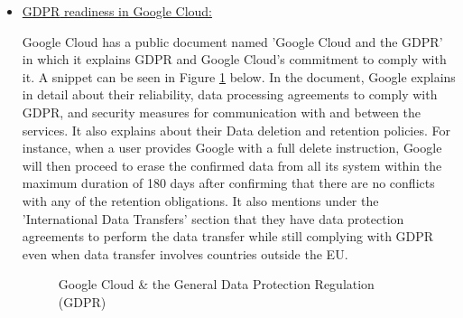 \begin{itemize}
    \item \underline{\acs{GDPR} readiness in Google Cloud:}

    Google Cloud has a public document named 'Google Cloud and the \ac{GDPR}' \cite{gcgdpr} in which it explains \acs{GDPR} and Google Cloud's commitment to comply with it. A snippet can be seen in Figure \ref{googlegdpr} below. In the document, Google explains in detail about their reliability, data processing agreements to comply with \acs{GDPR}, and security measures for communication with and between the services. It also explains about their Data deletion and retention policies. For instance, when a user provides Google with a full delete instruction, Google will then proceed to erase the confirmed data from all its system within the maximum duration of 180 days after confirming that there are no conflicts with any of the retention obligations. It also mentions under the 'International Data Transfers' section that they have data protection agreements to perform the data transfer while still complying with \acs{GDPR} even when data transfer involves countries outside the \acs{EU}.
    
    \begin {figure}[ht]
    \centering
    \caption{Google Cloud \& the General Data Protection Regulation (GDPR)}
    \label{googlegdpr}
    \end {figure}


\end{itemize}
